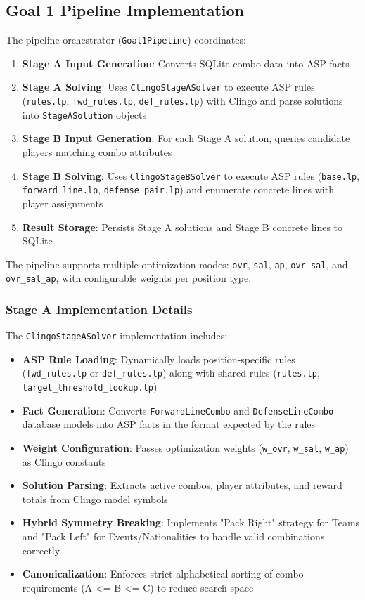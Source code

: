 \subsection{Goal 1 Pipeline Implementation}

The pipeline orchestrator (\texttt{Goal1Pipeline}) coordinates:

\begin{enumerate}
    \item \textbf{Stage A Input Generation}: Converts SQLite combo data into ASP facts
    \item \textbf{Stage A Solving}: Uses \texttt{ClingoStageASolver} to execute ASP rules (\texttt{rules.lp}, \texttt{fwd\_rules.lp}, \texttt{def\_rules.lp}) with Clingo and parse solutions into \texttt{StageASolution} objects
    \item \textbf{Stage B Input Generation}: For each Stage A solution, queries candidate players matching combo attributes
    \item \textbf{Stage B Solving}: Uses \texttt{ClingoStageBSolver} to execute ASP rules (\texttt{base.lp}, \texttt{forward\_line.lp}, \texttt{defense\_pair.lp}) and enumerate concrete lines with player assignments
    \item \textbf{Result Storage}: Persists Stage A solutions and Stage B concrete lines to SQLite
\end{enumerate}

The pipeline supports multiple optimization modes: \texttt{ovr}, \texttt{sal}, \texttt{ap}, \texttt{ovr\_sal}, and \texttt{ovr\_sal\_ap}, with configurable weights per position type.

\subsubsection{Stage A Implementation Details}

The \texttt{ClingoStageASolver} implementation includes:

\begin{itemize}
    \item \textbf{ASP Rule Loading}: Dynamically loads position-specific rules (\texttt{fwd\_rules.lp} or \texttt{def\_rules.lp}) along with shared rules (\texttt{rules.lp}, \texttt{target\_threshold\_lookup.lp})
    \item \textbf{Fact Generation}: Converts \texttt{ForwardLineCombo} and \texttt{DefenseLineCombo} database models into ASP facts in the format expected by the rules
    \item \textbf{Weight Configuration}: Passes optimization weights (\texttt{w\_ovr}, \texttt{w\_sal}, \texttt{w\_ap}) as Clingo constants
    \item \textbf{Solution Parsing}: Extracts active combos, player attributes, and reward totals from Clingo model symbols
    \item \textbf{Hybrid Symmetry Breaking}: Implements "Pack Right" strategy for Teams and "Pack Left" for Events/Nationalities to handle valid combinations correctly
    \item \textbf{Canonicalization}: Enforces strict alphabetical sorting of combo requirements (A <= B <= C) to reduce search space
\end{itemize}

